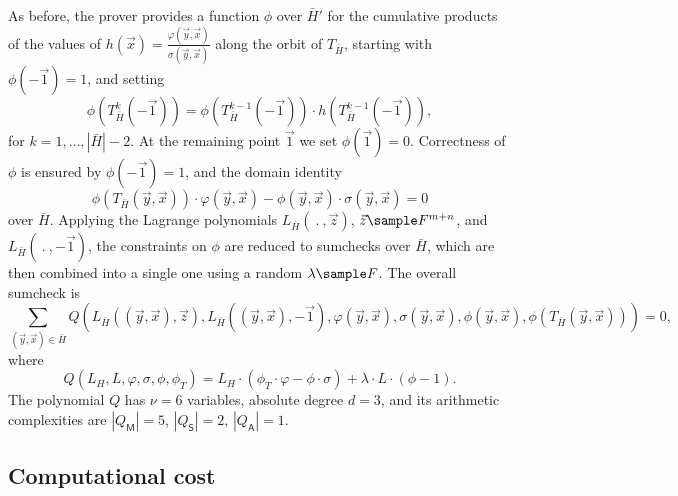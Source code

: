 \documentclass[11pt]{article}
\theoremstyle{definition}
\theoremstyle{definition}
\begin{document}
As before, the prover provides a function $\phi$ over $\bar H'$ for the cumulative products of the values of $h(\vec x) = \frac{\varphi(\vec y, \vec x)}{\sigma(\vec y,\vec x)}$ along the orbit of $T_{\bar H}$, starting with $\phi(-\vec 1)= 1$, and setting
\[
\phi(T_{\bar H}^k (-\vec 1)) = \phi(T_{\bar H}^{k-1} (-\vec 1)) \cdot h(T_{\bar H}^{k-1} (-\vec 1)), 
\] 
for $k=1, \ldots, |\bar H| - 2$. 
At the remaining point $\vec 1$ we set $\phi(\vec 1) = 0$. %
Correctness of $\phi$ is ensured by $\phi(-\vec 1) = 1$, and the domain identity
\begin{equation*}
\phi(T_{\bar H}(\vec y, \vec x)) \cdot \varphi(\vec y, \vec x)
- \phi(\vec y, \vec x) \cdot \sigma(\vec y, \vec x) = 0
\end{equation*}
over $\bar H$.
Applying the Lagrange polynomials $L_{\bar H}(\:.\:, \vec z)$, $\vec z \sample F^{m+n}$, and $L_{\bar H}(\:.\:, -\vec 1)$, the constraints on $\phi$ are reduced to sumchecks over $\bar H$, which are then combined into a single one using a random $\lambda\sample F$.
The overall sumcheck is
\[
\sum_{(\vec y, \vec x)\in \bar H} Q(L_{\bar H}((\vec y, \vec x) , \vec z), L_{\bar H}((\vec y, \vec x), -\vec 1), \varphi(\vec y, \vec x), \sigma(\vec y, \vec x), \phi(\vec y, \vec x),  \phi(T_{\bar H}(\vec y, \vec x))) = 0,
\]
where 
\begin{equation}
Q(L_H, L, \varphi, \sigma,\phi, \phi_T) = 
L_H\cdot (\phi_T\cdot \varphi - \phi\cdot \sigma) + \lambda\cdot L\cdot (\phi - 1).
\end{equation}
The polynomial $Q$ has $\nu=6$ variables, absolute degree $d=3$, and its arithmetic complexities are $|Q_\mathsf M|= 5$, $|Q_\mathsf S| = 2$, $|Q_\mathsf A|= 1$.

\subsection{Computational cost}
\end{document}
